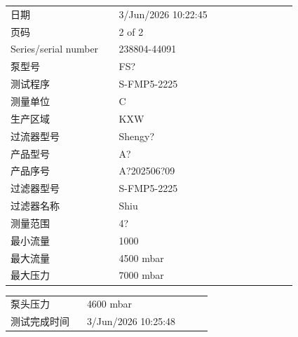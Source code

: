 \documentclass[UTF8,10pt,a4paper,fontset=fandol]{ctexart}
\newcommand{\fieldvalue}[1]{#1}
\begin{document}
\begin{tabular}{@{}p{0.34\linewidth}p{0.56\linewidth}@{}}
日期 &
\fieldvalue{3/Jun/2026 10:22:45}
\\[2pt]
页码 &
\fieldvalue{2 of 2}
\\[2pt]
Series/serial number &
\fieldvalue{238804-44091}
\\[2pt]
泵型号 &
\fieldvalue{FS?}
\\[2pt]
测试程序 &
\fieldvalue{S-FMP5-2225}
\\[2pt]
测量单位 &
\fieldvalue{C}
\\[2pt]
生产区域 &
\fieldvalue{KXW}
\\[2pt]
过流器型号 &
\fieldvalue{Shengy?}
\\[2pt]
产品型号 &
\fieldvalue{A?}
\\[2pt]
产品序号 &
\fieldvalue{A?202506?09}
\\[2pt]
过滤器型号 &
\fieldvalue{S-FMP5-2225}
\\[2pt]
过滤器名称 &
\fieldvalue{Shiu}
\\[2pt]
测量范围 &
\fieldvalue{4?}
\\[2pt]
最小流量 &
\fieldvalue{1000}
\\[2pt]
最大流量 &
\fieldvalue{4500 mbar}
\\[2pt]
最大压力 &
\fieldvalue{7000 mbar}
\end{tabular}

\vspace{1em}

\begin{tabular}{@{}p{0.34\linewidth}p{0.56\linewidth}@{}}
泵头压力 &
\fieldvalue{4600 mbar}
\\[2pt]
测试完成时间 &
\fieldvalue{3/Jun/2026 10:25:48}
\end{tabular}
\end{document}
